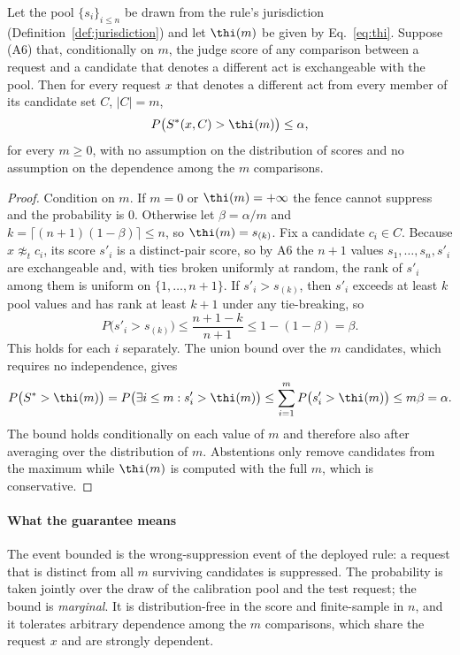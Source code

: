 \begin{theorem}\label{thm:bound}
Let the pool $\{s_i\}_{i\le n}$ be drawn from the rule's jurisdiction (Definition~\ref{def:jurisdiction}) and let $\thi(m)$ be given by Eq.~\eqref{eq:thi}. Suppose (A6) that, conditionally on $m$, the judge score of any comparison between a request and a candidate that denotes a different act is exchangeable with the pool. Then for every request $x$ that denotes a different act from every member of its candidate set $C$, $|C|=m$,
\[
P\big(S^\ast(x,C)>\thi(m)\big)\le\alpha ,
\]
for every $m\ge0$, with no assumption on the distribution of scores and no assumption on the dependence among the $m$ comparisons.
\end{theorem}

\begin{proof}
Condition on $m$. If $m=0$ or $\thi(m)=+\infty$ the fence cannot suppress and the probability is $0$. Otherwise let $\beta=\alpha/m$ and $k=\lceil(n+1)(1-\beta)\rceil\le n$, so $\thi(m)=s_{(k)}$. Fix a candidate $c_i\in C$. Because $x\not\approx_t c_i$, its score $s'_i$ is a distinct-pair score, so by A6 the $n+1$ values $s_1,\dots,s_n,s'_i$ are exchangeable and, with ties broken uniformly at random, the rank of $s'_i$ among them is uniform on $\{1,\dots,n+1\}$. If $s'_i>s_{(k)}$, then $s'_i$ exceeds at least $k$ pool values and has rank at least $k+1$ under any tie-breaking, so
\[
P\big(s'_i>s_{(k)}\big)\le\frac{n+1-k}{n+1}\le 1-(1-\beta)=\beta .
\]
This holds for each $i$ separately. The union bound over the $m$ candidates, which requires no independence, gives
\[
P\big(S^\ast>\thi(m)\big)=P\big(\exists i\le m: s'_i>\thi(m)\big)\le\sum_{i=1}^m P\big(s'_i>\thi(m)\big)\le m\beta=\alpha .
\]
The bound holds conditionally on each value of $m$ and therefore also after averaging over the distribution of $m$. Abstentions only remove candidates from the maximum while $\thi(m)$ is computed with the full $m$, which is conservative.
\end{proof}

\paragraph{What the guarantee means}
The event bounded is the wrong-suppression event of the deployed rule: a request that is distinct from all $m$ surviving candidates is suppressed. The probability is taken jointly over the draw of the calibration pool and the test request; the bound is \emph{marginal}. It is distribution-free in the score and finite-sample in $n$, and it tolerates arbitrary dependence among the $m$ comparisons, which share the request $x$ and are strongly dependent.

